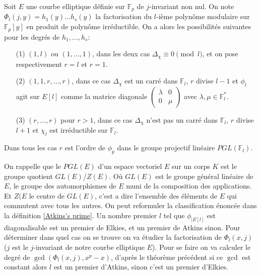 \documentclass{article}
\begin{document}
\begin{thm}
\label{thm calcul r}
Soit $E$ une courbe elliptique définie sur $\mathbb{F}_p$ de $j$-invariant non nul. On note $\Phi_l(j,y) = h_1(y) \ldots h_s(y)$ la factorisation du $l$-ième polynôme modulaire sur $\mathbb{F}_p[y]$ en produit de polynôme irréductible. On a alors les possibilités suivantes pour les degrés de $h_1, \ldots, h_s$:
\begin{itemize}
\item[(1)] $(1,l)$ ou $(1,\ldots,1)$, dans les deux cas $\Delta_{\chi} \equiv 0 \pmod l$, et on pose respectivement $r=l $ et $r=1$.
\item[(2)] $(1,1,r,\ldots,r)$, dans ce cas $\Delta_{\chi}$ est un carré dans $\mathbb{F}_l$, $r$ divise $l-1$ et $\phi_l$ agit sur $E[l]$ comme la matrice diagonale $\begin{pmatrix}
\lambda & 0 \\
0 & \mu
\end{pmatrix}$ avec $\lambda,\mu \in \mathbb{F}_l^*$.
\item[(3)] $(r, \ldots, r)$ pour $r>1$, dans ce cas $\Delta_{\chi}$ n'est pas un carré dans $\mathbb{F}_l$, $r$ divise $l+1$ et $\chi_l$ est irréductible sur $\mathbb{F}_l$.
\end{itemize}

Dans tous les cas $r$ est l'ordre de $\phi_p$ dans le groupe projectif linéaire $PGL(\mathbb{F}_l)$.

\end{thm}
 On rappelle que le $PGL(E)$ d'un espace vectoriel $E$ sur un corps $K$ est le groupe quotient $GL(E)$/$Z(E)$. Où $GL(E)$ est le groupe général linéaire de $E$, le groupe des automorphismes de $E$ muni de la composition des applications. Et $Z(E$ le centre de $GL(E)$, c'est a dire l'ensemble des éléments de $E$ qui commutent avec tous les autres.
\newline
On peut reformuler la classification énoncée dans la définition \ref{Atkins's prime}. Un nombre premier $l$ tel que $\phi_{|E[l]}$ est diagonalisable est un premier de Elkies, et un premier de Atkins sinon. Pour déterminer dans quel cas on se trouve on va étudier la factorisation de $\Phi_l(x,j)$ ($j$ est le $j$-invariant de notre courbe elliptique $E$). Pour se faire on va calculer le degré de $\gcd(\Phi_l(x,j),x^p-x)$, d'après le théorème précédent si ce $\gcd$ est constant alors $l$ est un premier d'Atkins, sinon c'est un premier d'Elkies.
\end{document}
